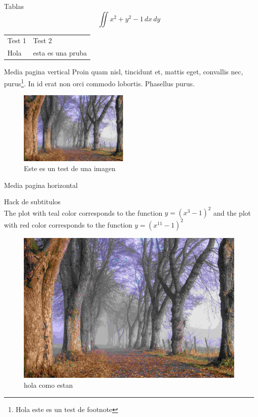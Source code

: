 \documentclass[aspectratio=169, 9pt]{beamer}
\begin{document}
\begin{frame}[label={sec:org490eb83}]{Tablas}
\[ \iint x^2 + y^2 - 1 \,dx \,dy \]
\begin{center}
\begin{tabular}{|l|l|}
Test 1 & Test 2\\
Hola & esta es una pruba\\
\end{tabular}

\end{center}
\end{frame}

\begin{frame}[label={sec:org1f1fd42}]{Media pagina vertical}
Proin quam nisl, tincidunt et, mattis eget, convallis nec, purus\footnote{Hola este es un test de footnote}.
In id erat non orci commodo lobortis.  Phasellus purus. 

\begin{figure}[htbp]
\centering
\includegraphics[width=200px]{images/2019-11-30-Marienallee_Dahlem-7978.jpg}
\caption{Este es un test de una imagen}
\end{figure}
\end{frame}

\begin{frame}[label={sec:org9be4e44}]{Media pagina horizontal}
\begin{twoc}
\alert{Hack de subtitulos} \\
The plot with teal color corresponds to the function \(y=(x^3-1)^2\) and the plot
with red color corresponds to the function \(y=(x^{11}-1)^2\)   
\end{twoc}
\begin{threec}
\begin{figure}[htbp]
\centering
\includegraphics[width=.9\linewidth]{images/2019-11-30-Marienallee_Dahlem-7978.jpg}
\caption{hola como estan}
\end{figure}
\end{threec}
\end{frame}
\end{document}
